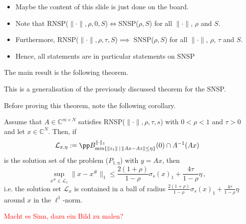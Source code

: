 \documentclass[11pt]{beamer}
\newcommand{\CC}{\mathbb{C}}
\begin{document}
\begin{frame}
	\begin{itemize}
		\item Maybe the content of this slide is just done on the board.
		\item Note that RNSP($\|\cdot\|,\rho,0,S$)$\iff$SNSP($\rho,S$) for all \(\|\cdot\|\), \(\rho\) and \(S\).
		\item Furthermore, RNSP($\|\cdot\|,\rho,\tau,S$)$\implies$ SNSP($\rho,S$) for all \(\|\cdot\|\), \(\rho\), \(\tau\) and \(S\).
\item Hence, all statements are in particular statements on SNSP
	\end{itemize}
\end{frame}

\begin{frame}{}
    The main result is the following theorem.
    This is a generalisation of the previously discussed theorem for the SNSP.

\end{frame}

\begin{frame}{}
Before proving this theorem, note the following corollary.
    \begin{Kor}
        {}{}
        Assume that \(A\in\CC^{m\times N}\) satisfies RNSP(\(\|\cdot\|,\rho,\tau,s\)) with \(0<\rho<1\) and \(\tau>0\) and let \(x\in \CC^N\). Then, if
        \[\mathcal L_{x,\eta}:
        =\pp B_{\min\{\|z_1\|\,|\,\|Ax-Az\|\le \eta\}}^{\|\cdot\|_1}(0)\cap A^{-1}(Ax)
        \]
        is the solution set of the problem ($P_{1,\eta}$) with \(y=Ax\), then 
        \[\sup_{x^{\#}\in \mathcal L_x}\|x-x^{\#}\|_1\le \frac{2(1+\rho)}{1-\rho}\sigma_s(x)_1+\frac{4\tau}{1-\rho}\eta\,,\]
        i.e. the solution set \(\mathcal L_x\) is contained in a ball of radius \(\frac{2(1+\rho)}{1-\rho}\sigma_s(x)_1+\frac{4\tau}{1-\rho}\eta\) around \(x\) in the \(\ell^1\)-norm.
    \end{Kor}
    \textcolor{red}{Macht es Sinn, dazu ein Bild zu malen?}
\end{frame}
\end{document}
